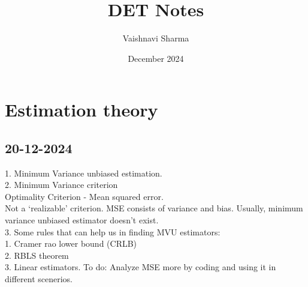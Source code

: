 \documentclass{article}
\title{DET Notes}
\author{Vaishnavi Sharma}
\date{December 2024}
\begin{document}
\maketitle

\section{Estimation theory}
\subsection{20-12-2024}
1. Minimum Variance unbiased estimation.\\
2. Minimum Variance criterion \\
Optimality Criterion - Mean squared error. \\
Not a `realizable' criterion.
MSE consists of variance and bias. Usually, minimum variance unbiased estimator doesn't exist.\\
3. Some rules that can help us in finding MVU estimators:\\
1. Cramer rao lower bound (CRLB)\\
2. RBLS theorem\\
3. Linear estimators.
To do: Analyze MSE more by coding and using it in different scenerios.
\end{document}
